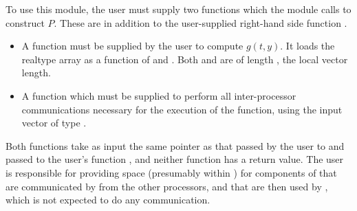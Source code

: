 To use this {\cvbbdpre} module, the user must supply two functions which the
module calls to construct $P$. These are in addition to the user-supplied
right-hand side function .
\begin{itemize}
\item A function  must
  be supplied by the user to compute $g(t,y)$. It loads the realtype array
   as a function of  and .  
  Both  and  are of length , the
  local vector length.
\item  A function  which must be supplied to
  perform all inter-processor communications necessary for the execution of
  the  function, using the input vector  of type 
  .
\end{itemize}
Both functions take as input the same pointer  as that passed
by the user to  and passed to the user's function ,
and neither function has a return value. The user is responsible for
providing space (presumably within ) for components of 
that are communicated by  from the other processors, and that are
then used by , which is not expected to do any communication.

